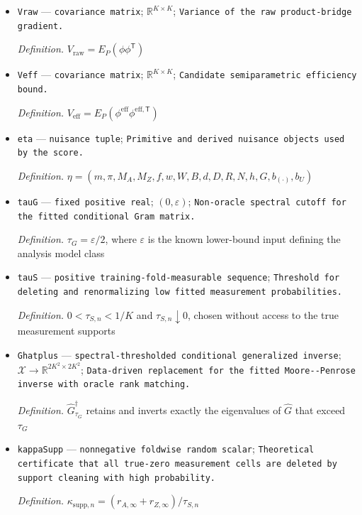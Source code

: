 \documentclass{article}
\begin{document}
\begin{itemize}
  \item \texttt{Vraw} --- \texttt{covariance matrix}; \(\mathbb R^{K\times K}\); \texttt{Variance of the raw product-\allowbreak{}bridge gradient.}
  \par\smallskip\noindent\emph{Definition.} \(V_{\mathrm{raw}}=E_P(\phi\phi^{\mathsf T})\)
  \item \texttt{Veff} --- \texttt{covariance matrix}; \(\mathbb R^{K\times K}\); \texttt{Candidate semiparametric efficiency bound.}
  \par\smallskip\noindent\emph{Definition.} \(V_{\mathrm{eff}}=E_P(\phi^{\mathrm{eff}}\phi^{\mathrm{eff},\mathsf T})\)
  \item \texttt{eta} --- \texttt{nuisance tuple}; \texttt{Primitive and derived nuisance objects used by the score.}
  \par\smallskip\noindent\emph{Definition.} \(\eta=(m,\pi,M_A,M_Z,f,w,W,B,d,D,R,N,h,G,b_{(\cdot)},b_U)\)
  \item \texttt{tauG} --- \texttt{fixed positive real}; \((0,\varepsilon)\); \texttt{Non-\allowbreak{}oracle spectral cutoff for the fitted conditional Gram matrix.}
  \par\smallskip\noindent\emph{Definition.} \(\tau_G=\varepsilon/2\), where \(\varepsilon\) is the known lower-bound input defining the analysis model class
  \item \texttt{tauS} --- \texttt{positive training-\allowbreak{}fold-\allowbreak{}measurable sequence}; \texttt{Threshold for deleting and renormalizing low fitted measurement probabilities.}
  \par\smallskip\noindent\emph{Definition.} \(0<\tau_{S,n}<1/K\) and \(\tau_{S,n}\downarrow0\), chosen without access to the true measurement supports
  \item \texttt{Ghatplus} --- \texttt{spectral-\allowbreak{}thresholded conditional generalized inverse}; \(\mathcal X\to\mathbb R^{2K^2\times2K^2}\); \texttt{Data-\allowbreak{}driven replacement for the fitted Moore-\allowbreak{}-\allowbreak{}Penrose inverse with oracle rank matching.}
  \par\smallskip\noindent\emph{Definition.} \(\widehat G_{\tau_G}^{\dagger}\) retains and inverts exactly the eigenvalues of \(\widehat G\) that exceed \(\tau_G\)
  \item \texttt{kappaSupp} --- \texttt{nonnegative foldwise random scalar}; \texttt{Theoretical certificate that all true-\allowbreak{}zero measurement cells are deleted by support cleaning with high probability.}
  \par\smallskip\noindent\emph{Definition.} \(\kappa_{\mathrm{supp},n}=(r_{A,\infty}+r_{Z,\infty})/\tau_{S,n}\)

\end{itemize}
\end{document}
